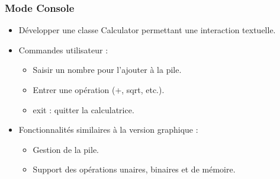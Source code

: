 \documentclass[12pt]{report}
\begin{document}
            \subsubsection*{Mode Console}
                \begin{itemize}
                    \item Développer une classe Calculator permettant une interaction textuelle.
                    \item Commandes utilisateur :
                    \begin{itemize}
                        \item Saisir un nombre pour l’ajouter à la pile.
                        \item Entrer une opération (+, sqrt, etc.).
                        \item exit : quitter la calculatrice.
                    \end{itemize}

                    \item Fonctionnalités similaires à la version graphique :
                    \begin{itemize}
                        \item Gestion de la pile.
                        \item Support des opérations unaires, binaires et de mémoire.
                    \end{itemize}
                \end{itemize}
\end{document}
